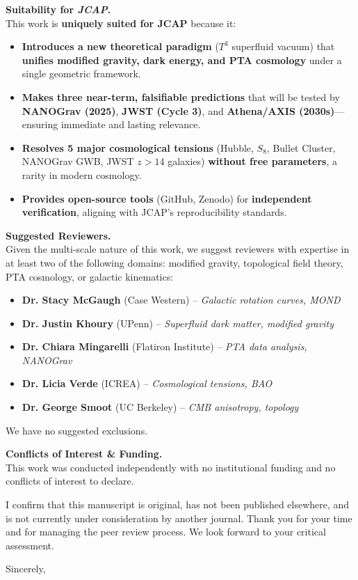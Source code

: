 \documentclass[10pt, a4paper]{article}
\begin{document}
\vspace{0.4em}
\noindent\textbf{Suitability for \textit{JCAP}.} \\
This work is \textbf{uniquely suited for JCAP} because it:
\begin{itemize}[noitemsep,topsep=0pt,parsep=0pt,partopsep=0pt]
  \item \textbf{Introduces a new theoretical paradigm} ($T^3$ superfluid vacuum) that \textbf{unifies modified gravity, dark energy, and PTA cosmology} under a single geometric framework.
  \item \textbf{Makes three near-term, falsifiable predictions} that will be tested by \textbf{NANOGrav (2025)}, \textbf{JWST (Cycle 3)}, and \textbf{Athena/AXIS (2030s)}---ensuring immediate and lasting relevance.
  \item \textbf{Resolves 5 major cosmological tensions} (Hubble, $S_8$, Bullet Cluster, NANOGrav GWB, JWST $z > 14$ galaxies) \textbf{without free parameters}, a rarity in modern cosmology.
  \item \textbf{Provides open-source tools} (GitHub, Zenodo) for \textbf{independent verification}, aligning with JCAP's reproducibility standards.
\end{itemize}

\vspace{0.4em}
\noindent\textbf{Suggested Reviewers.} \\
Given the multi-scale nature of this work, we suggest reviewers with expertise in at least two of the following domains: modified gravity, topological field theory, PTA cosmology, or galactic kinematics:
\begin{itemize}[noitemsep,topsep=0pt,parsep=0pt,partopsep=0pt]
  \item \textbf{Dr. Stacy McGaugh} (Case Western) -- \textit{Galactic rotation curves, MOND}
  \item \textbf{Dr. Justin Khoury} (UPenn) -- \textit{Superfluid dark matter, modified gravity}
  \item \textbf{Dr. Chiara Mingarelli} (Flatiron Institute) -- \textit{PTA data analysis, NANOGrav}
  \item \textbf{Dr. Licia Verde} (ICREA) -- \textit{Cosmological tensions, BAO}
  \item \textbf{Dr. George Smoot} (UC Berkeley) -- \textit{CMB anisotropy, topology}
\end{itemize}
We have no suggested exclusions.

\vspace{0.4em}
\noindent\textbf{Conflicts of Interest \& Funding.} \\
This work was conducted independently with no institutional funding and no conflicts of interest to declare.

\vspace{0.4em}
I confirm that this manuscript is original, has not been published elsewhere, and is not currently under consideration by another journal. Thank you for your time and for managing the peer review process. We look forward to your critical assessment.

\vspace{1em}
\noindent Sincerely,
\end{document}
